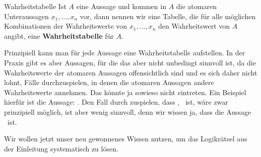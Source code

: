 \documentclass[../../main.tex]{subfiles}
\begin{document}
\begin{definition}{Wahrheitstabelle}
Ist $A$ eine Aussage und kommen in $A$ die atomaren Unteraussagen $x_1,\dots,x_n$ vor, dann nennen wir eine Tabelle, die für alle möglichen Kombinationen der Wahrheitswerte von $x_1,\dots,x_n$ den Wahrheitswert von $A$ angibt, eine \textbf{Wahrheitstabelle} für $A$.
\end{definition}

Prinzipiell kann man für jede Aussage eine Wahrheitstabelle aufstellen. 
In der Praxis gibt es aber Aussagen, für die das aber nicht unbedingt 
sinnvoll ist, da die Wahrheitswerte der atomaren Aussagen offensichtlich sind 
und es sich daher nicht lohnt, Fälle durchzuspielen, in denen die atomaren 
Aussagen andere Wahrheitswerte annehmen. Das könnte ja sowieso nicht eintreten. 
Ein Beispiel hierfür ist die Aussage: . 
Den Fall durch zuspielen, dass , \falsch\ ist, wäre zwar 
prinzipiell möglich, ist aber wenig sinnvoll, denn wir wissen ja, dass die Aussage \wahr\  ist.

Wir wollen jetzt unser neu gewonnenes Wissen nutzen, um das Logikrätsel aus 
der Einleitung systematisch zu lösen.
\end{document}
